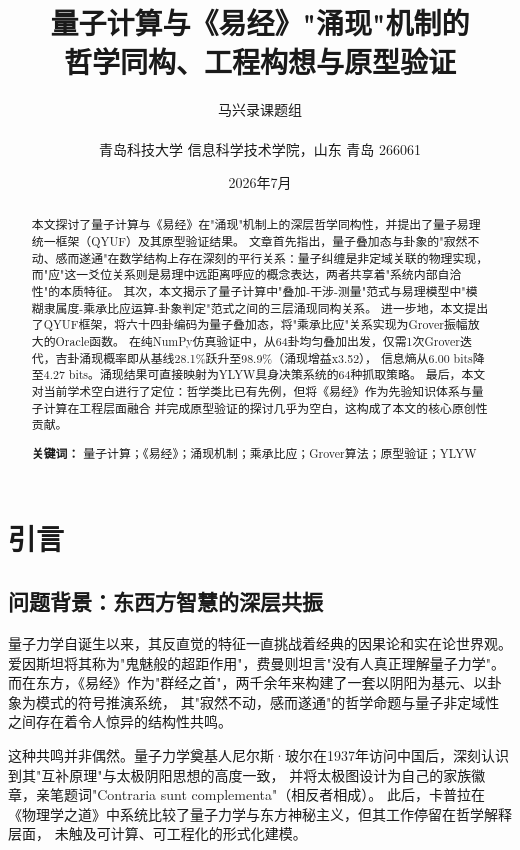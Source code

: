 \documentclass[twocolumn]{article}
\title{\textbf{量子计算与《易经》"涌现"机制的\\哲学同构、工程构想与原型验证}}
\author{马兴录课题组\\\\
青岛科技大学 信息科学技术学院，山东 青岛 266061}
\date{2026年7月}
\begin{document}
\maketitle

\begin{abstract}
本文探讨了量子计算与《易经》在"涌现"机制上的深层哲学同构性，并提出了量子易理统一框架（QYUF）及其原型验证结果。
文章首先指出，量子叠加态与卦象的"寂然不动、感而遂通"在数学结构上存在深刻的平行关系：量子纠缠是非定域关联的物理实现，
而"应"这一爻位关系则是易理中远距离呼应的概念表达，两者共享着"系统内部自洽性"的本质特征。
其次，本文揭示了量子计算中"叠加-干涉-测量"范式与易理模型中"模糊隶属度-乘承比应运算-卦象判定"范式之间的三层涌现同构关系。
进一步地，本文提出了QYUF框架，将六十四卦编码为量子叠加态，将"乘承比应"关系实现为Grover振幅放大的Oracle函数。
在纯NumPy仿真验证中，从64卦均匀叠加出发，仅需1次Grover迭代，吉卦涌现概率即从基线28.1\%跃升至98.9\%（涌现增益x3.52），
信息熵从6.00 bits降至4.27 bits。涌现结果可直接映射为YLYW具身决策系统的64种抓取策略。
最后，本文对当前学术空白进行了定位：哲学类比已有先例，但将《易经》作为先验知识体系与量子计算在工程层面融合
并完成原型验证的探讨几乎为空白，这构成了本文的核心原创性贡献。

\textbf{关键词：} 量子计算；《易经》；涌现机制；乘承比应；Grover算法；原型验证；YLYW
\end{abstract}

\section{引言}

\subsection{问题背景：东西方智慧的深层共振}

量子力学自诞生以来，其反直觉的特征一直挑战着经典的因果论和实在论世界观。
爱因斯坦将其称为"鬼魅般的超距作用"，费曼则坦言"没有人真正理解量子力学"\cite{feynman1965}。
而在东方，《易经》作为"群经之首"，两千余年来构建了一套以阴阳为基元、以卦象为模式的符号推演系统，
其"寂然不动，感而遂通"的哲学命题与量子非定域性之间存在着令人惊异的结构性共鸣。

这种共鸣并非偶然。量子力学奠基人尼尔斯·玻尔在1937年访问中国后，深刻认识到其"互补原理"与太极阴阳思想的高度一致，
并将太极图设计为自己的家族徽章，亲笔题词"Contraria sunt complementa"（相反者相成）\cite{bohr1949}。
此后，卡普拉在《物理学之道》中系统比较了量子力学与东方神秘主义\cite{capra1975}，但其工作停留在哲学解释层面，
未触及可计算、可工程化的形式化建模。
\end{document}

